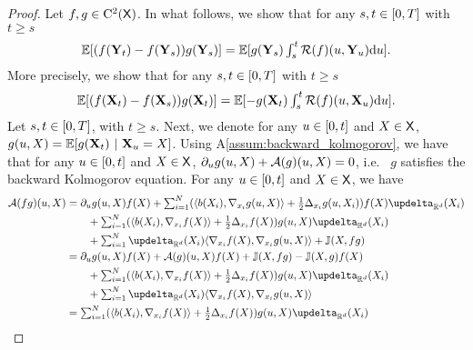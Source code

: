   \begin{proof}
    Let $f, g \in \mathrm{C}^2(\mathsf{X})$. In what follows, we show that for any $s, t \in [ 0,T ]$ with $t \geq s$
    \begin{equation}
      \textstyle \mathbb{E}[(f(\mathbf{Y}_t) - f(\mathbf{Y}_s))g(\mathbf{Y}_s) ] = \mathbb{E}[g(\mathbf{Y}_s) \int_s^t \mathcal{R}(f)(u, \mathbf{Y}_u) \mathrm{d} u ] . 
    \end{equation}
    More precisely, we  show that for any $s, t \in [ 0,T ]$ with $t \geq s$
    \begin{equation}
      \textstyle \mathbb{E}[(f(\mathbf{X}_t) - f(\mathbf{X}_s))g(\mathbf{X}_t) ] = \mathbb{E}[-g(\mathbf{X}_t) \int_s^t \mathcal{R}(f)(u, \mathbf{X}_u) \mathrm{d} u ] . 
    \end{equation}
    Let $s, t \in [ 0,T ]$, with $t \geq s$. Next, we denote for any
    $u \in [ 0,t ]$ and $X \in \mathsf{X}$,
    $g(u,X) = \mathbb{E}[g(\mathbf{X}_t) \ | \ \mathbf{X}_u=X]$. Using
    A\ref{assum:backward_kolmogorov}, we have that for any $u \in [ 0,t ]$
    and $X \in \mathsf{X}$, $\partial_u g(u,X) + \mathcal{A}(g)(u,X) = 0$, i.e.~ $g$
    satisfies the backward Kolmogorov equation. For any $u \in [ 0,t ]$ and
    $X \in \mathsf{X}$, we have
    \begin{align}
      \calA(fg)(u, X) &= \textstyle \partial_u g(u,X) f(X) + \sum_{i=1}^N (\langle b(X_i), \nabla_{x_i} g(u,X) \rangle + \tfrac{1}{2} \Delta_{x_i} g(u,X_i)) f(X) \updelta_{\rset^d}(X_i) \\
                      &\qquad \textstyle +\sum_{i=1}^N (\langle b(X_i), \nabla_{x_i} f(X) \rangle + \tfrac{1}{2} \Delta_{x_i} f(X)) g(u,X) \updelta_{\rset^d}(X_i) \\
                      & \qquad \textstyle + \sum_{i=1}^N \updelta_{\rset^d}(X_i) \langle \nabla_{x_i} f(X), \nabla_{x_i} g(u,X) \rangle 
                        + \Jbb(X, fg) \\
                      &= \partial_u g(u,X) f(X) + \calA(g)(u,X) f(X)+ \Jbb(X, fg) - \Jbb(X, g)f(X)  \\
                      &\qquad \textstyle +\sum_{i=1}^N (\langle b(X_i), \nabla_{x_i} f(X) \rangle + \tfrac{1}{2} \Delta_{x_i} f(X)) g(u,X) \updelta_{\rset^d}(X_i) \\
                      & \qquad \textstyle + \sum_{i=1}^N \updelta_{\rset^d}(X_i) \langle \nabla_{x_i} f(X), \nabla_{x_i} g(u,X) \rangle \\
                      &= \textstyle \sum_{i=1}^N (\langle b(X_i), \nabla_{x_i} f(X) \rangle + \tfrac{1}{2} \Delta_{x_i} f(X)) g(u,X) \updelta_{\rset^d}(X_i)  \\

\end{align}
\end{proof}
